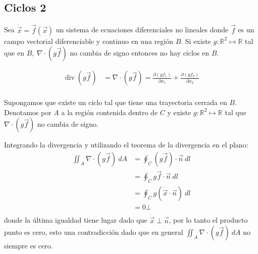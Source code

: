 \subsection{Ciclos 2}


\begin{tcolorbox}[colback=Black!4, colframe=White, arc=2mm]
  \begin{teorema} 
  Sea $\dot{\vec{x}} = \vec{f}(\vec{x})$ un sistema de ecuaciones diferenciales no lineales donde $\vec{f}$ es un campo vectorial diferenciable y continuo en una región $B$. Si existe $g: \mathbb{R}^2 \mapsto \mathbb{R}$ tal que en $B ,\ \nabla \cdot (g \vec{f})$ no cambia de signo entonces no hay ciclos en $B$.
  \end{teorema}
\end{tcolorbox}
\begin{tcolorbox}[colback=Black!4, colframe=White, arc=2mm]
\begin{recordatorio}$$
\begin{aligned}
  \operatorname{div}(g \vec{f}) &= \nabla \cdot (g \vec{f}) = \frac{\partial (gf_1)}{\partial x_1} + \frac{\partial (gf_2)}{\partial x_2}  \\  
\end{aligned}   
$$
\end{recordatorio}
\end{tcolorbox}

\begin{tcolorbox}[colback=Black!4, colframe=White, arc=2mm]
\begin{demostracion}
Supongamos que existe un ciclo tal que tiene una trayectoria cerrada en $B$. Denotamos por  $A$ a la región contenida dentro de  $C$ y existe  $g:\mathbb{R}^2 \mapsto \mathbb{R}$ tal que $\nabla \cdot (g \vec{f})$ no cambia de signo.

Integrando la divergencia y utilizando el teorema de la divergencia en el plano:
$$
\begin{aligned}
  \iint_{{A}}^{{}} {\nabla \cdot (g \vec{f})} \: d{A} &= \oint_{{C}}^{{}} {(g \vec{f})\cdot \vec{n}} \: d{l}  \\
  &= \oint_{{C}}^{{}} {g \vec{f} \cdot \vec{n}} \: d{l} \\ 
  &= \oint_{{C}}^{{}} {g(\dot{\vec{x}}\cdot\vec{n})} \: d{l} \\
  &= 0 \bot \\ 
\end{aligned}
$$
donde la última igualdad tiene lugar dado que $\dot{\vec{x}} \perp \vec{n}$, por lo tanto el producto punto es cero, esto una contradicción dado que en general $\iint_{{A}}^{{}} {\nabla \cdot (g \vec{f})} \: d{A} $ no siempre es cero.    
\end{demostracion}
\end{tcolorbox}

